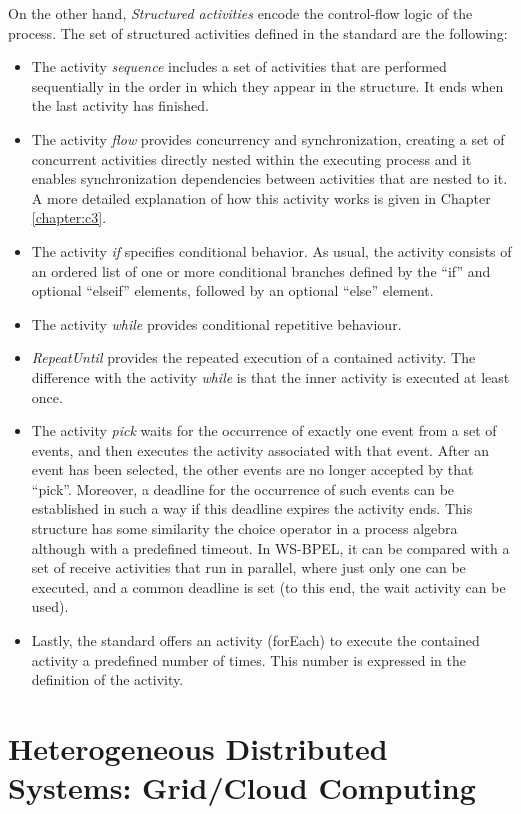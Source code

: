 On the other hand, \emph{Structured activities} encode the control-flow logic of the process.
The set of structured activities defined in the standard are the following:
\begin{itemize}
\item The activity \emph{sequence} includes a set of activities that are performed sequentially in the
order in which they appear in the structure. It ends
when the last activity has finished.
\item The activity \emph{flow} provides concurrency and synchronization, creating 
a set of concurrent activities directly nested within the executing process and it enables
synchronization dependencies between activities that are nested to it. A more detailed explanation
of how this activity works is given in Chapter \ref{chapter:c3}.
\item The activity \emph{if} specifies conditional behavior. As usual, the activity consists of an ordered list of one or
more conditional branches defined by the ``if'' and optional ``elseif'' elements, followed by an
optional ``else'' element.
\item The activity \emph{while} provides conditional repetitive behaviour.
\item \emph{RepeatUntil} provides the repeated execution of a contained activity. The difference with
the activity \emph{while} is that the inner activity is executed at least once.
\item The activity \emph{pick} waits for the occurrence of exactly one event from a set of events, and then
executes the activity associated with that event. After an event has been selected, the other events
are no longer accepted by that ``pick''. Moreover, a deadline for the occurrence of such events can be established
in such a way if this deadline expires the activity ends. This structure has some similarity the choice operator in
a process algebra although with a predefined timeout. 
In WS-BPEL, it can be compared with a set of receive activities that run in parallel, where just only one can be executed,
and a common deadline is set (to this end, the wait activity can be used).
\item Lastly, the standard offers an activity (forEach) to execute the contained activity a predefined number of times. This number
 is expressed in the definition of the activity.
\end{itemize}


\section{Heterogeneous Distributed Systems: Grid/Cloud Computing}

